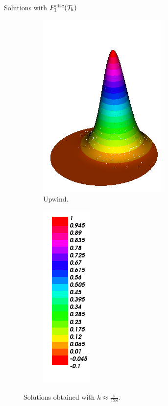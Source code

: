 \begin{frame}{Solutions with $\relax{P}^{\text{disc}}_1(\mathcal{T}_h)$}
\begin{figure}[h!]
\begin{subfigure}[b]{0.27\textwidth}
				\includegraphics[scale=0.18]{img/Conveccion_Reaccion/Recortes/steady_convect_react_approx_UPW_n_256.png}
				\caption{Upwind.}
			\end{subfigure}
			\begin{subfigure}[b]{0.15\textwidth}
				\centering
				\includegraphics[scale=0.18]{img/Conveccion_Reaccion/Recortes/steady_convect_react_values.png}
			\end{subfigure}
			\caption{Solutions obtained with $h\approx\frac{\pi}{128}$.}
		\end{figure}
		\end{frame}
		
